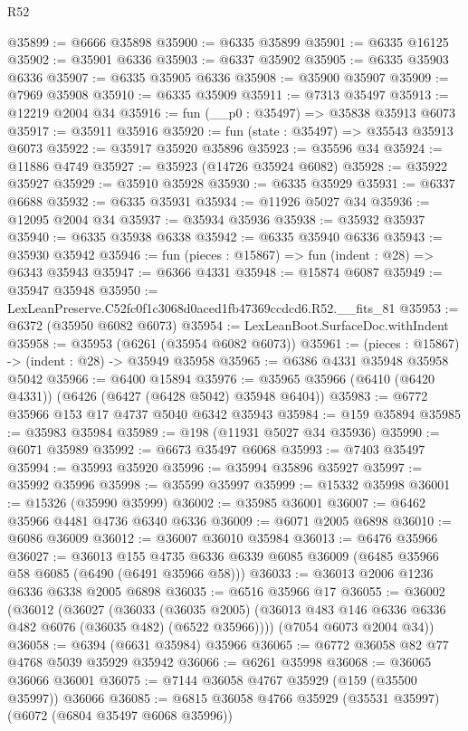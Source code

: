 \begin{lexlean}{R52}
\begin{coremodule}
@35899 := @6666 @35898
@35900 := @6335 @35899
@35901 := @6335 @16125
@35902 := @35901 @6336
@35903 := @6337 @35902
@35905 := @6335 @35903 @6336
@35907 := @6335 @35905 @6336
@35908 := @35900 @35907
@35909 := @7969 @35908
@35910 := @6335 @35909
@35911 := @7313 @35497
@35913 := @12219 @2004 @34
@35916 := fun (__p0 : @35497) => @35838 @35913 @6073
@35917 := @35911 @35916
@35920 := fun (state : @35497) => @35543 @35913 @6073
@35922 := @35917 @35920 @35896
@35923 := @35596 @34
@35924 := @11886 @4749
@35927 := @35923 (@14726 @35924 @6082)
@35928 := @35922 @35927
@35929 := @35910 @35928
@35930 := @6335 @35929
@35931 := @6337 @6688
@35932 := @6335 @35931
@35934 := @11926 @5027 @34
@35936 := @12095 @2004 @34
@35937 := @35934 @35936
@35938 := @35932 @35937
@35940 := @6335 @35938 @6338
@35942 := @6335 @35940 @6336
@35943 := @35930 @35942
@35946 := fun (pieces : @15867) => fun (indent : @28) => @6343 @35943
@35947 := @6366 @4331
@35948 := @15874 @6087
@35949 := @35947 @35948
@35950 := LexLeanPreserve.C52fc0f1c3068d0aced1fb47369ccdcd6.R52.__fits_81
@35953 := @6372 (@35950 @6082 @6073)
@35954 := LexLeanBoot.SurfaceDoc.withIndent
@35958 := @35953 (@6261 (@35954 @6082 @6073))
@35961 := (pieces : @15867) -> (indent : @28) -> @35949 @35958
@35965 := @6386 @4331 @35948 @35958 @5042
@35966 := @6400 @15894
@35976 := @35965 @35966 (@6410 (@6420 @4331)) (@6426 (@6427 (@6428 @5042) @35948 @6404))
@35983 := @6772 @35966 @153 @17 @4737 @5040 @6342 @35943
@35984 := @159 @35894
@35985 := @35983 @35984
@35989 := @198 (@11931 @5027 @34 @35936)
@35990 := @6071 @35989
@35992 := @6673 @35497 @6068
@35993 := @7403 @35497
@35994 := @35993 @35920
@35996 := @35994 @35896 @35927
@35997 := @35992 @35996
@35998 := @35599 @35997
@35999 := @15332 @35998
@36001 := @15326 (@35990 @35999)
@36002 := @35985 @36001
@36007 := @6462 @35966 @4481 @4736 @6340 @6336
@36009 := @6071 @2005 @6898
@36010 := @6086 @36009
@36012 := @36007 @36010 @35984
@36013 := @6476 @35966
@36027 := @36013
    @155
    @4735
    @6336
    @6339
    @6085
    @36009
    (@6485 @35966 @58 @6085 (@6490 (@6491 @35966 @58)))
@36033 := @36013 @2006 @1236 @6336 @6338 @2005 @6898
@36035 := @6516 @35966 @17
@36055 := @36002
    (@36012
      (@36027
        (@36033
          (@36035 @2005)
          (@36013 @483 @146 @6336 @6336 @482 @6076 (@36035 @482) (@6522 @35966))))
      (@7054 @6073 @2004 @34))
@36058 := @6394 (@6631 @35984) @35966
@36065 := @6772 @36058 @82 @77 @4768 @5039 @35929 @35942
@36066 := @6261 @35998
@36068 := @36065 @36066 @36001
@36075 := @7144 @36058 @4767 @35929 (@159 (@35500 @35997)) @36066
@36085 := @6815 @36058 @4766 @35929 (@35531 @35997) (@6072 (@6804 @35497 @6068 @35996))

\end{coremodule}
\end{lexlean}
